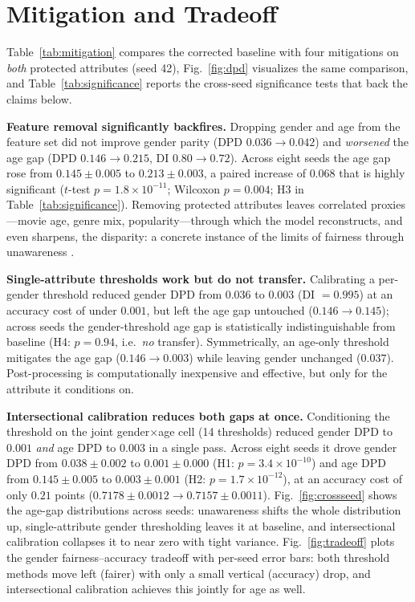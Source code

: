 \documentclass[conference]{IEEEtran}
\begin{document}
\section{Mitigation and Tradeoff}\label{sec:mitigation}
Table~\ref{tab:mitigation} compares the corrected baseline with four mitigations on
\emph{both} protected attributes (seed 42), Fig.~\ref{fig:dpd} visualizes the same
comparison, and Table~\ref{tab:significance} reports the cross-seed significance tests
that back the claims below.

\textbf{Feature removal significantly backfires.} Dropping gender and age from the
feature set did not improve gender parity (DPD $0.036\rightarrow0.042$) and
\emph{worsened} the age gap (DPD $0.146\rightarrow0.215$, DI $0.80\rightarrow0.72$).
Across eight seeds the age gap rose from $0.145\pm0.005$ to $0.213\pm0.003$, a paired
increase of $0.068$ that is highly significant ($t$-test $p=1.8\times10^{-11}$; Wilcoxon
$p=0.004$; H3 in Table~\ref{tab:significance}). Removing protected attributes leaves
correlated proxies---movie age, genre mix, popularity---through which the model
reconstructs, and even sharpens, the disparity: a concrete instance of the limits of
fairness through unawareness \cite{dwork2012fairness}.

\textbf{Single-attribute thresholds work but do not transfer.} Calibrating a per-gender
threshold reduced gender DPD from $0.036$ to $0.003$ (DI $=0.995$) at an accuracy cost of
under $0.001$, but left the age gap untouched ($0.146\rightarrow0.145$); across seeds the
gender-threshold age gap is statistically indistinguishable from baseline (H4:
$p=0.94$, i.e.\ \emph{no} transfer). Symmetrically, an age-only threshold mitigates the age
gap ($0.146\rightarrow0.003$) while leaving gender unchanged ($0.037$). Post-processing is
computationally inexpensive and effective, but only for the attribute it conditions on.

\textbf{Intersectional calibration reduces both gaps at once.} Conditioning the threshold
on the joint gender$\times$age cell (14 thresholds) reduced gender DPD to $0.001$
\emph{and} age DPD to $0.003$ in a single pass. Across eight seeds it drove gender DPD from
$0.038\pm0.002$ to $0.001\pm0.000$ (H1: $p=3.4\times10^{-10}$) and age DPD from
$0.145\pm0.005$ to $0.003\pm0.001$ (H2: $p=1.7\times10^{-12}$), at an accuracy cost of only
$0.21$ points ($0.7178\pm0.0012\rightarrow0.7157\pm0.0011$). Fig.~\ref{fig:crossseed}
shows the age-gap distributions across seeds: unawareness shifts the whole distribution
up, single-attribute gender thresholding leaves it at baseline, and intersectional
calibration collapses it to near zero with tight variance. Fig.~\ref{fig:tradeoff} plots
the gender fairness--accuracy tradeoff with per-seed error bars: both threshold methods
move left (fairer) with only a small vertical (accuracy) drop, and intersectional
calibration achieves this jointly for age as well.
\end{document}
